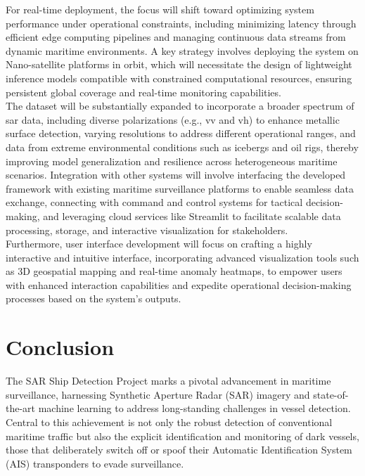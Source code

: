\documentclass{article}
\begin{document}
	For real-time deployment, the focus will shift toward optimizing system performance under operational constraints, including minimizing latency through efficient edge computing pipelines and managing continuous data streams from dynamic maritime environments. A key strategy involves deploying the system on Nano-satellite platforms in orbit, which will necessitate the design of lightweight inference models compatible with constrained computational resources, ensuring persistent global coverage and real-time monitoring capabilities. \\
	
	The dataset will be substantially expanded to incorporate a broader spectrum of \acrshort{sar} data, including diverse polarizations (e.g., \acrshort{vv} and \acrshort{vh}) to enhance metallic surface detection, varying resolutions to address different operational ranges, and data from extreme environmental conditions such as icebergs and oil rigs, thereby improving model generalization and resilience across heterogeneous maritime scenarios. Integration with other systems will involve interfacing the developed framework with existing maritime surveillance platforms to enable seamless data exchange, connecting with command and control systems for tactical decision-making, and leveraging cloud services like Streamlit to facilitate scalable data processing, storage, and interactive visualization for stakeholders.\\
	
	Furthermore, user interface development will focus on crafting a highly interactive and intuitive interface, incorporating advanced visualization tools such as 3D geospatial mapping and real-time anomaly heatmaps, to empower users with enhanced interaction capabilities and expedite operational decision-making processes based on the system’s outputs. \newpage
	\section{Conclusion}
	The SAR Ship Detection Project marks a pivotal advancement in maritime surveillance, harnessing Synthetic Aperture Radar (SAR) imagery and state-of-the-art machine learning to address long-standing challenges in vessel detection. Central to this achievement is not only the robust detection of conventional maritime traffic but also the explicit identification and monitoring of dark vessels, those that deliberately switch off or spoof their Automatic Identification System (AIS) transponders to evade surveillance.\\
	
\end{document}
